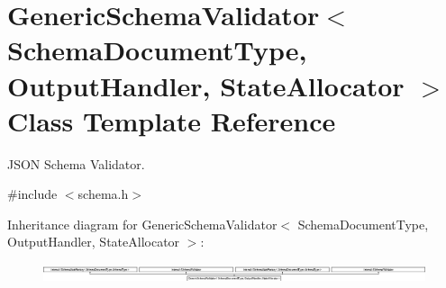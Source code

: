 \hypertarget{class_generic_schema_validator}{}\section{Generic\+Schema\+Validator$<$ Schema\+Document\+Type, Output\+Handler, State\+Allocator $>$ Class Template Reference}
\label{class_generic_schema_validator}


J\+S\+ON Schema Validator.  




{\ttfamily \#include $<$schema.\+h$>$}

Inheritance diagram for Generic\+Schema\+Validator$<$ Schema\+Document\+Type, Output\+Handler, State\+Allocator $>$\+:\begin{figure}[H]
\begin{center}
\leavevmode
\includegraphics[height=0.567951cm]{class_generic_schema_validator}
\end{center}
\end{figure}

